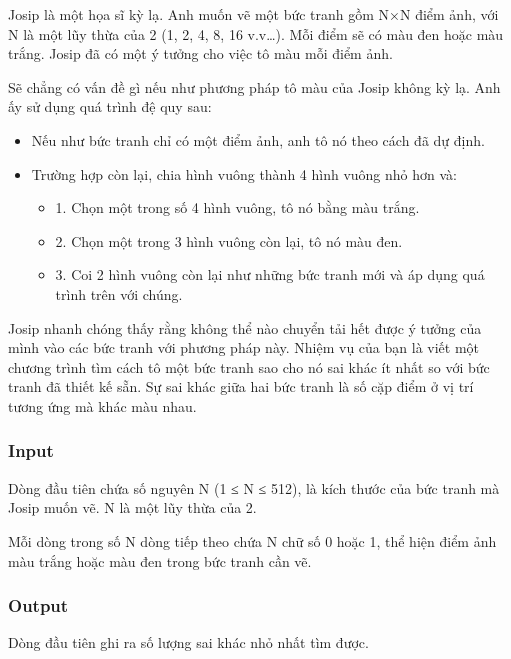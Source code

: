



   Josip là một họa sĩ kỳ lạ. Anh muốn vẽ một bức tranh gồm N×N điểm ảnh, với N là một lũy thừa của 2 (1, 2, 4, 8, 16 v.v…). Mỗi điểm sẽ có màu đen hoặc màu trắng. Josip đã có một ý tưởng cho việc tô màu mỗi điểm ảnh.  

   Sẽ chẳng có vấn đề gì nếu như phương pháp tô màu của Josip không kỳ lạ. Anh ấy sử dụng quá trình đệ quy sau:  
\begin{itemize}
	\item     Nếu như bức tranh chỉ có một điểm ảnh, anh tô nó theo cách đã dự định.   
	\item     Trường hợp còn lại, chia hình vuông thành 4 hình vuông nhỏ hơn và:    
\begin{itemize}
	\item       1. Chọn một trong số 4 hình vuông, tô nó bằng màu trắng.     
	\item       2. Chọn một trong 3 hình vuông còn lại, tô nó màu đen.     
	\item       3. Coi 2 hình vuông còn lại như những bức tranh mới và áp dụng quá trình trên với chúng.     
\end{itemize}
\end{itemize}

   Josip nhanh chóng thấy rằng không thể nào chuyển tải hết được ý tưởng của mình vào các bức tranh với phương pháp này. Nhiệm vụ của bạn là viết một chương trình tìm cách tô một bức tranh sao cho nó sai khác ít nhất so với bức tranh đã thiết kế sẵn. Sự sai khác giữa hai bức tranh là số cặp điểm ở vị trí tương ứng mà khác màu nhau.  

\subsubsection{   Input  }

   Dòng đầu tiên chứa số nguyên N (1 ≤ N ≤ 512), là kích thước của bức tranh mà Josip muốn vẽ. N là một lũy thừa của 2.  

   Mỗi dòng trong số N dòng tiếp theo chứa N chữ số 0 hoặc 1, thể hiện điểm ảnh màu trắng hoặc màu đen trong bức tranh cần vẽ.  

\subsubsection{   Output  }

   Dòng đầu tiên ghi ra số lượng sai khác nhỏ nhất tìm được.  

